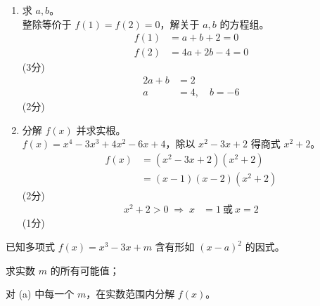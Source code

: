 \documentclass{exam-zh}
\newcommand{\qscoreoffset}{4em}
\newcommand{\qscore}[2][\%]{%
    \leavevmode\unskip\nobreak\hfill
    \makebox[0pt][l]{\makebox[\qscoreoffset][r]{(#2#1)}}%
}
\begin{document}
\begin{solution}
    \begin{enumerate}[label=(\alph*)]
        \item 求 $a,b$。 \\
        整除等价于 $f(1)=f(2)=0$，解关于 $a,b$ 的方程组。
        \begin{align*}
            f(1) &= a+b+2 = 0 \\
            f(2) &= 4a+2b-4 = 0
        \end{align*}
        \hfill (3分) \\
        \begin{align*}
            2a+b &= 2 \\
            a &= 4,\quad b=-6
        \end{align*}
        \hfill (2分)

        \item 分解 $f(x)$ 并求实根。 \\
        $f(x)=x^4-3x^3+4x^2-6x+4$，除以 $x^2-3x+2$ 得商式 $x^2+2$。
        \begin{align*}
            f(x) &= (x^2-3x+2)(x^2+2) \\
            &= (x-1)(x-2)(x^2+2)
        \end{align*}
        \hfill (2分) \\
        \begin{align*}
            x^2+2 > 0 \;\Longrightarrow\; x &= 1 \ \text{或} \ x = 2
        \end{align*}
        \hfill (1分)
    \end{enumerate}
\end{solution}

\begin{question}[points = 10]
    已知多项式 $f(x)=x^3-3x+m$ 含有形如 $(x-a)^2$ 的因式。

    \begin{questionparts}
        \item 求实数 $m$ 的所有可能值； \qscore{6}

        \item 对 (a) 中每一个 $m$，在实数范围内分解 $f(x)$。 \qscore{4}
    \end{questionparts}
\end{question}
\end{document}
